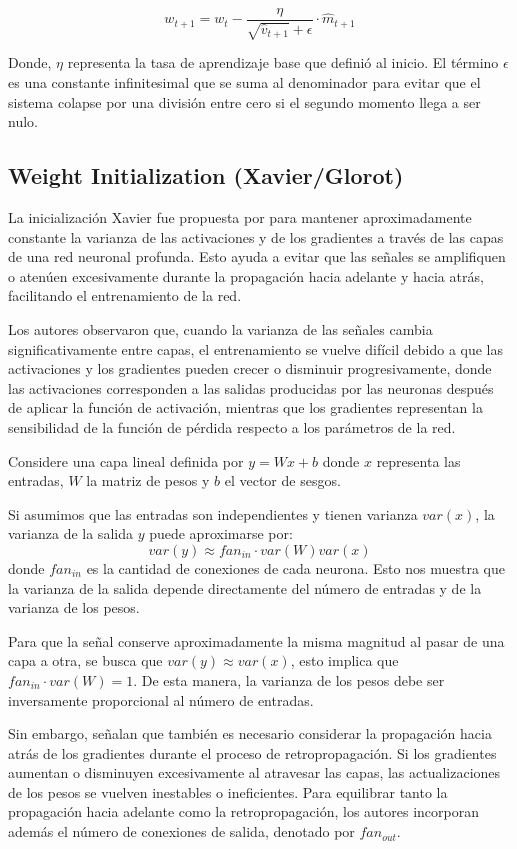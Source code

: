 \documentclass[12pt]{article}
\begin{document}
$$w_{t+1} = w_t - \frac{\eta}{\sqrt{\hat{v}_{t+1}} + \epsilon} \cdot \hat{m}_{t+1}$$

Donde, $\eta$ representa la tasa de aprendizaje base que definió al inicio. El 
término $\epsilon$ es una constante infinitesimal que se suma al denominador para evitar 
que el sistema colapse por una división entre cero si el segundo momento llega a ser nulo.


\subsection{Weight Initialization (Xavier/Glorot)}
La inicialización Xavier fue propuesta por \textcite{GLOROT2010} para 
mantener aproximadamente constante la varianza de las activaciones y de 
los gradientes a través de las capas de una red neuronal profunda. 
Esto ayuda a evitar que las señales se amplifiquen o atenúen excesivamente 
durante la propagación hacia adelante y hacia atrás, facilitando el 
entrenamiento de la red.

Los autores observaron que, cuando la varianza de las señales cambia 
significativamente entre capas, el entrenamiento se vuelve difícil 
debido a que las activaciones y los gradientes pueden crecer o 
disminuir progresivamente, donde las activaciones corresponden a las salidas 
producidas por las neuronas después de aplicar la función de activación, 
mientras que los gradientes representan la sensibilidad de la función de 
pérdida respecto a los parámetros de la red.

Considere una capa lineal definida por $y = Wx+b$ donde $x$ representa las 
entradas, $W$ la matriz de pesos y $b$ el vector 
de sesgos. 

Si asumimos que las entradas son independientes y tienen varianza $var(x)$, 
la varianza de la salida $y$ puede aproximarse por:
$$var(y) \approx fan_{in} \cdot var(W)var(x)$$ donde $fan_{in}$ es la 
cantidad de conexiones de cada neurona. Esto nos muestra que la 
varianza de la salida depende directamente del número de entradas 
y de la varianza de los pesos.

Para que la señal conserve aproximadamente la misma magnitud al pasar de 
una capa a otra, se busca que $var(y) \approx var(x)$, esto implica
que $fan_{in} \cdot var(W) = 1$. De esta manera, la varianza 
de los pesos debe ser inversamente proporcional al número de entradas.

Sin embargo, \textcite{GLOROT2010} señalan que también es necesario 
considerar la propagación hacia atrás de los gradientes durante el 
proceso de retropropagación. Si los gradientes aumentan o disminuyen 
excesivamente al atravesar las capas, las actualizaciones de los pesos 
se vuelven inestables o ineficientes. Para equilibrar tanto la propagación 
hacia adelante como la retropropagación, los autores incorporan además 
el número de conexiones de salida, denotado por $fan_{out}$.
\end{document}
